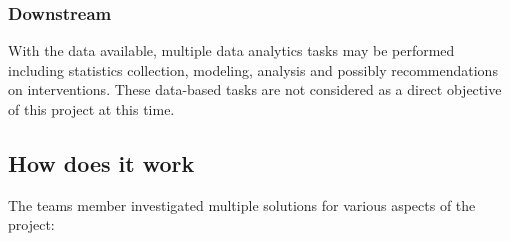 \documentclass[12pt, a4paper]{article}
\begin{document}
\subsubsection*{Downstream}

With the data available, multiple data analytics tasks may be
performed including statistics collection, modeling, analysis and
possibly recommendations on interventions. These data-based tasks are
not considered as a direct objective of this project at this time.



\subsection*{How does it work}

The teams member investigated multiple solutions for various aspects
of the project:
\end{document}
